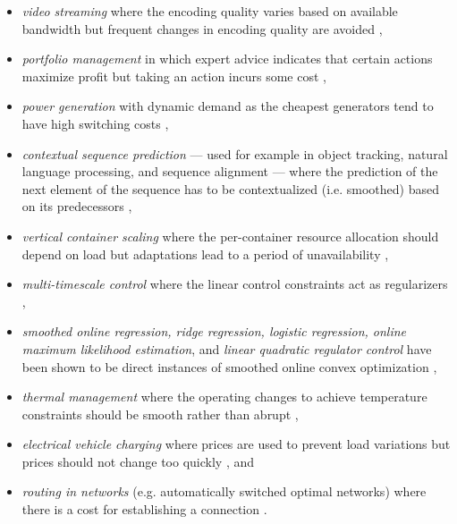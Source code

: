 \begin{itemize}
    \item \emph{video streaming} where the encoding quality varies based on available bandwidth but frequent changes in encoding quality are avoided \cite{Lin2012},
    \item \emph{portfolio management} in which expert advice indicates that certain actions maximize profit but taking an action incurs some cost \cite{Calafiore2008, Das2014, Ballu2019},
    \item \emph{power generation} with dynamic demand as the cheapest generators tend to have high switching costs \cite{Lin2012, Badiei2015},
    \item \emph{contextual sequence prediction} --- used for example in object tracking, natural language processing, and sequence alignment --- where the prediction of the next element of the sequence has to be contextualized (i.e. smoothed) based on its predecessors \cite{Kim2015},
    \item \emph{vertical container scaling} where the per-container resource allocation should depend on load but adaptations lead to a period of unavailability \cite{Rossi2019},
    \item \emph{multi-timescale control} where the linear control constraints act as regularizers \cite{Goel2017},
    \item \emph{smoothed online regression, ridge regression, logistic regression, online maximum likelihood estimation}, and \emph{linear quadratic regulator control} have been shown to be direct instances of smoothed online convex optimization \cite{Goel2018},
    \item \emph{thermal management} where the operating changes to achieve temperature constraints should be smooth rather than abrupt \cite{Zanini2009},
    \item \emph{electrical vehicle charging} where prices are used to prevent load variations but prices should not change too quickly \cite{Kim2014}, and
    \item \emph{routing in networks} (e.g. automatically switched optimal networks) where there is a cost for establishing a connection \cite{Lin2012}.
\end{itemize}

